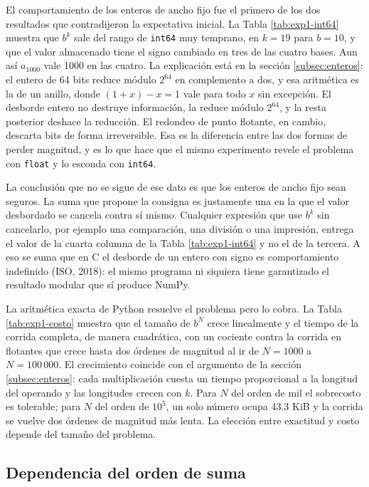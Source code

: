 El comportamiento de los enteros de ancho fijo fue el primero de los dos resultados que
contradijeron la expectativa inicial. La
Tabla \ref{tab:exp1-int64} muestra que $b^{k}$ sale del rango de \texttt{int64} muy temprano, en
$k = 19$ para $b = 10$, y que el valor almacenado tiene el signo cambiado en tres de las cuatro
bases. Aun así $a_{1000}$ vale 1000 en las cuatro. La explicación está en la sección
\ref{subsec:enteros}: el entero de 64 bits reduce módulo $2^{64}$ en complemento a dos, y esa
aritmética es la de
un anillo, donde $(1 + x) - x = 1$ vale para todo $x$ sin excepción. El desborde entero no destruye
información, la reduce módulo $2^{64}$, y la resta posterior deshace la reducción. El redondeo de
punto flotante, en cambio, descarta bits de forma irreversible. Esa es la diferencia entre las dos
formas de perder magnitud, y es lo que hace que el mismo experimento revele el problema con
\texttt{float} y lo esconda con \texttt{int64}.

La conclusión que no se sigue de ese dato es que los enteros de ancho fijo sean seguros. La suma que
propone la consigna es justamente una en la que el valor desbordado se cancela contra sí mismo.
Cualquier expresión que use $b^{k}$ sin cancelarlo, por ejemplo una comparación, una división o una
impresión, entrega el valor de la cuarta columna de la Tabla \ref{tab:exp1-int64} y no el de la
tercera. A eso se suma que en C el desborde de un entero con signo es comportamiento indefinido
(ISO, 2018): el mismo programa ni siquiera tiene garantizado el resultado modular que sí produce
NumPy.

La aritmética exacta de Python resuelve el problema pero lo cobra. La Tabla \ref{tab:exp1-costo}
muestra que el tamaño de $b^{N}$ crece linealmente y el tiempo de la corrida completa, de manera
cuadrática, con un cociente contra la corrida en flotantes que crece hasta dos órdenes de magnitud
al ir de $N = 1000$ a $N = 100\,000$. El crecimiento coincide con el argumento de la sección \ref{subsec:enteros}: cada
multiplicación cuesta un tiempo proporcional a la longitud del operando y las longitudes crecen con
$k$. Para $N$ del orden de mil el sobrecosto es tolerable; para $N$ del orden de $10^{5}$, un solo
número ocupa 43.3 KiB y la corrida se vuelve dos órdenes de magnitud más lenta. La elección entre
exactitud y costo depende del tamaño del problema.

\subsection{Dependencia del orden de suma}
\label{subsec:dis-orden}

